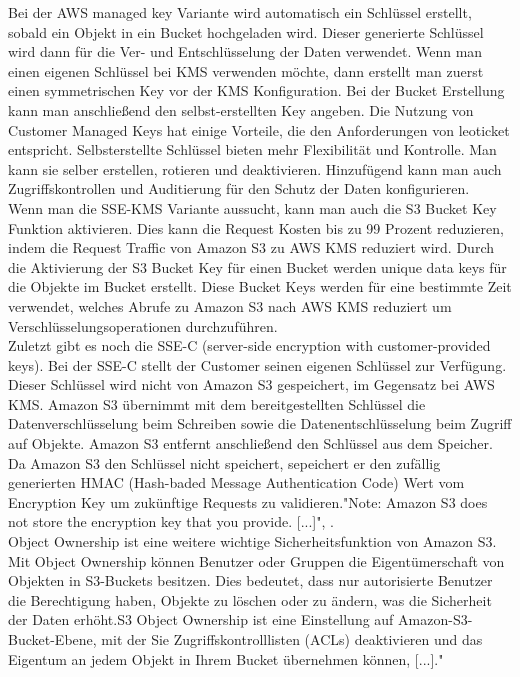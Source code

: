 Bei der AWS managed key Variante wird automatisch ein Schlüssel erstellt, sobald ein Objekt in ein Bucket hochgeladen wird. Dieser generierte Schlüssel wird dann für die Ver- und Entschlüsselung der Daten verwendet. Wenn man einen eigenen Schlüssel bei KMS verwenden möchte, dann erstellt man zuerst einen symmetrischen Key vor der KMS Konfiguration. Bei der Bucket Erstellung kann man anschließend den selbst-erstellten Key angeben. Die Nutzung von Customer Managed Keys hat einige Vorteile, die den Anforderungen von leoticket entspricht. Selbsterstellte Schlüssel bieten mehr Flexibilität und Kontrolle. Man kann sie selber erstellen, rotieren und deaktivieren. Hinzufügend kann man auch Zugriffskontrollen und Auditierung für den Schutz der Daten konfigurieren.\\

Wenn man die SSE-KMS Variante aussucht, kann man auch die S3 Bucket Key Funktion aktivieren. Dies kann die Request Kosten bis zu 99 Prozent reduzieren, indem die Request Traffic von Amazon S3 zu AWS KMS reduziert wird. Durch die Aktivierung der S3 Bucket Key für einen Bucket werden unique data keys für die Objekte im Bucket erstellt. Diese Bucket Keys werden für eine bestimmte Zeit verwendet, welches Abrufe zu Amazon S3 nach AWS KMS reduziert um Verschlüsselungsoperationen durchzuführen.\\

Zuletzt gibt es noch die SSE-C (server-side encryption with customer-provided keys). Bei der SSE-C stellt der Customer seinen eigenen Schlüssel zur Verfügung. Dieser Schlüssel wird nicht von Amazon S3 gespeichert, im Gegensatz bei AWS KMS. Amazon S3 übernimmt mit dem bereitgestellten Schlüssel die Datenverschlüsselung beim Schreiben sowie die Datenentschlüsselung beim Zugriff auf Objekte. Amazon S3 entfernt anschließend den Schlüssel aus dem Speicher. Da Amazon S3 den Schlüssel nicht speichert, sepeichert er den zufällig generierten HMAC (Hash-baded Message Authentication Code) Wert vom Encryption Key um zukünftige Requests zu validieren."Note: Amazon S3 does not store the encryption key that you provide. [...]", \cite{aws-sse-c}.\\

Object Ownership ist eine weitere wichtige Sicherheitsfunktion von Amazon S3. Mit Object Ownership können Benutzer oder Gruppen die Eigentümerschaft von Objekten in S3-Buckets besitzen. Dies bedeutet, dass nur autorisierte Benutzer die Berechtigung haben, Objekte zu löschen oder zu ändern, was die Sicherheit der Daten erhöht.\glqq S3 Object Ownership ist eine Einstellung auf Amazon-S3-Bucket-Ebene, mit der Sie Zugriffskontrolllisten (ACLs) deaktivieren und das Eigentum an jedem Objekt in Ihrem Bucket übernehmen können, [...]." \cite{aws-iam-s3}\\ 

